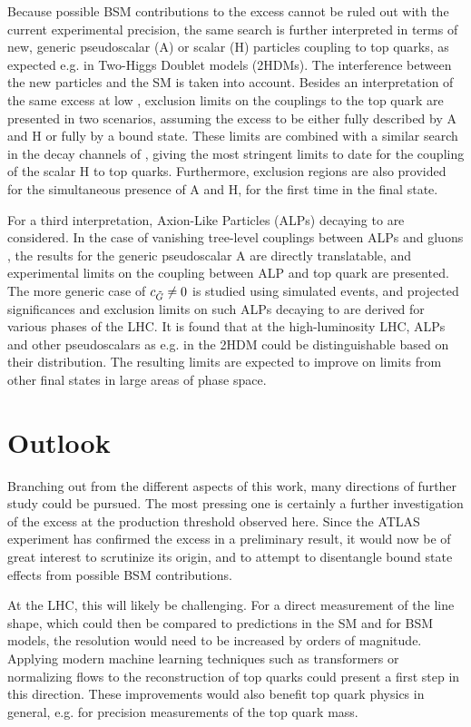Because possible BSM contributions to the excess cannot be ruled out with the current experimental precision, 
the same search is further interpreted in terms of new, generic pseudoscalar (A) or scalar (H) particles coupling to top quarks, as expected e.g. in Two-Higgs Doublet models (2HDMs). The interference between the new particles and the SM is taken into account. %
Besides an interpretation of the same excess at low \mtt, exclusion limits on the couplings to the top quark are presented in two scenarios, assuming the excess to be either fully described by A and H or fully by a \ttbar bound state. These limits are combined with a similar search in the \ljets decay channels of \ttbar, giving the most stringent limits to date for the coupling of the scalar H to top quarks. Furthermore, exclusion regions are also provided for the simultaneous presence of A and H, for the first time in the \ttbar final state.

For a third interpretation, Axion-Like Particles (ALPs) decaying to \ttbar are considered. In the case of vanishing tree-level couplings between ALPs and gluons \cG, the results for the generic pseudoscalar A are directly translatable, and experimental limits on the coupling between ALP and top quark are presented. The more generic case of $c_{\tilde{G}} \neq 0$ is studied using simulated events, and projected significances and exclusion limits on such ALPs decaying to \ttbar are derived for various phases of the LHC. It is found that at the high-luminosity LHC, ALPs and other pseudoscalars as e.g. in the 2HDM could be distinguishable based on their \mtt distribution. The resulting limits are expected to improve on limits from other final states in large areas of phase space.

\section{Outlook}

Branching out from the different aspects of this work, many directions of further study could be pursued. The most pressing one is certainly a further investigation of the excess at the \ttbar production threshold observed here. Since the ATLAS experiment has confirmed the excess in a preliminary result,
it would now be of great interest to scrutinize its origin, and to attempt to disentangle \ttbar bound state effects from possible BSM contributions.

At the LHC, this will likely be challenging. For a direct measurement of the line shape, which could then be compared to predictions in the SM and for BSM models, the \mtt resolution would need to be increased by orders of magnitude. Applying modern machine learning techniques such as transformers or normalizing flows to the reconstruction of top quarks could present a first step in this direction. These improvements would also benefit top quark physics in general, e.g. for precision measurements of the top quark mass.

